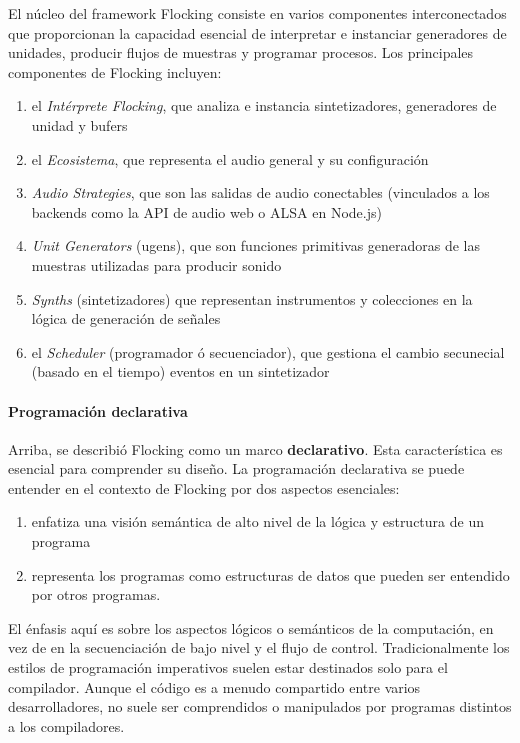\documentclass[]{article}
\let\oldparagraph\paragraph
\renewcommand{\paragraph}[1]{\oldparagraph{#1}\mbox{}}
\begin{document}
El núcleo del framework Flocking consiste en varios componentes
interconectados que proporcionan la capacidad esencial de interpretar e
instanciar generadores de unidades, producir flujos de muestras y
programar procesos. Los principales componentes de Flocking incluyen:

\begin{enumerate}
\def\labelenumi{\arabic{enumi}.}
\item
  el \emph{Intérprete Flocking}, que analiza e instancia sintetizadores,
  generadores de unidad y bufers
\item
  el \emph{Ecosistema}, que representa el audio general y su
  configuración
\item
  \emph{Audio Strategies}, que son las salidas de audio conectables
  (vinculados a los backends como la API de audio web o ALSA en Node.js)
\item
  \emph{Unit Generators} (ugens), que son funciones primitivas
  generadoras de las muestras utilizadas para producir sonido
\item
  \emph{Synths} (sintetizadores) que representan instrumentos y
  colecciones en la lógica de generación de señales
\item
  el \emph{Scheduler} (programador ó secuenciador), que gestiona el
  cambio secunecial (basado en el tiempo) eventos en un sintetizador
\end{enumerate}

\hypertarget{programaciuxf3n-declarativa}{%
\paragraph{Programación declarativa}\label{programaciuxf3n-declarativa}}

Arriba, se describió Flocking como un marco \textbf{declarativo}. Esta
característica es esencial para comprender su diseño. La programación
declarativa se puede entender en el contexto de Flocking por dos
aspectos esenciales:

\begin{enumerate}
\def\labelenumi{\arabic{enumi}.}
\item
  enfatiza una visión semántica de alto nivel de la lógica y estructura
  de un programa
\item
  representa los programas como estructuras de datos que pueden ser
  entendido por otros programas.
\end{enumerate}

El énfasis aquí es sobre los aspectos lógicos o semánticos de la
computación, en vez de en la secuenciación de bajo nivel y el flujo de
control. Tradicionalmente los estilos de programación imperativos suelen
estar destinados solo para el compilador. Aunque el código es a menudo
compartido entre varios desarrolladores, no suele ser comprendidos o
manipulados por programas distintos a los compiladores.
\end{document}
